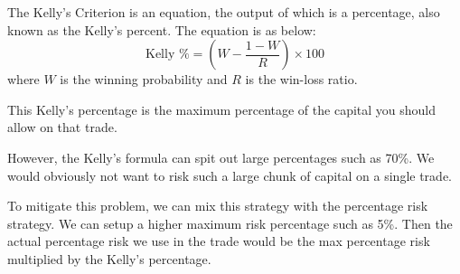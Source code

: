 The Kelly’s Criterion is an equation, the output of which is a percentage, also known as the Kelly’s percent. The equation is as below:
\[
  \textrm{Kelly \%} = \left( W - \frac{1-W}{R} \right) \times 100
\]
where $W$ is the winning probability and $R$ is the win-loss ratio.


This Kelly's percentage is the maximum percentage of the capital you should allow on that trade.

However, the Kelly's formula can spit out large percentages such as 70\%. We would obviously not want to risk such a large chunk of capital on a single trade.

To mitigate this problem, we can mix this strategy with the percentage risk strategy. We can setup a higher maximum risk percentage such as 5\%. Then the actual percentage risk we use in the trade would be the max percentage risk multiplied by the Kelly's percentage.

